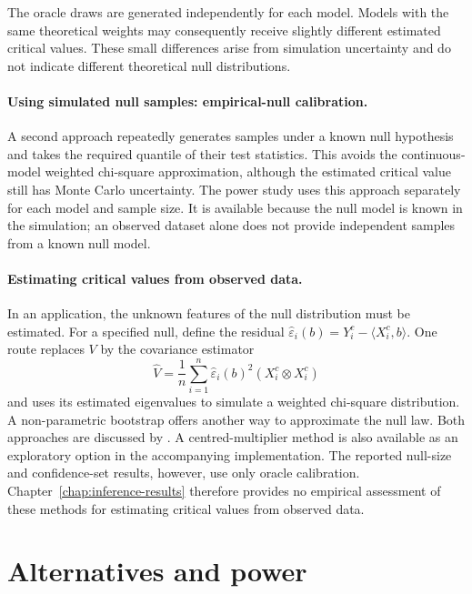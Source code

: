 The oracle draws are generated independently for each model.  Models with
the same theoretical weights may consequently receive slightly different
estimated critical values.  These small differences arise from simulation
uncertainty and do not indicate different theoretical null distributions.

\paragraph{Using simulated null samples: empirical-null calibration.}
A second approach repeatedly generates samples under a known null
hypothesis and takes the required quantile of their test statistics.
This avoids the continuous-model weighted chi-square approximation,
although the estimated critical value still has Monte Carlo uncertainty.
The power study uses this approach separately for each model and sample
size.  It is available because the null model is known in the simulation;
an observed dataset alone does not provide independent samples from a known
null model.

\paragraph{Estimating critical values from observed data.}
In an application, the unknown features of the null distribution must be
estimated.  For a specified null, define the residual
$\widehat\varepsilon_i(b)=Y_i^c-\langle X_i^c,b\rangle$.  One route replaces
$V$ by the covariance estimator
\begin{equation}
    \widehat V
    =\frac1n\sum_{i=1}^{n}
      \widehat\varepsilon_i(b)^2
      (X_i^c\otimes X_i^c)
    \label{eq:inference-plugin-variance}
\end{equation}
and uses its estimated eigenvalues to simulate a weighted chi-square
distribution.  A non-parametric bootstrap offers another way to approximate
the null law.  Both approaches are discussed by
\textcite{babii_carrasco_tsafack_2026}.  A centred-multiplier method is also
available as an exploratory option in the accompanying implementation.
The reported null-size and confidence-set results, however, use only oracle
calibration.  Chapter~\ref{chap:inference-results} therefore provides no
empirical assessment of these methods for estimating critical values from
observed data.

\section{Alternatives and power}
\label{sec:inference-power}

